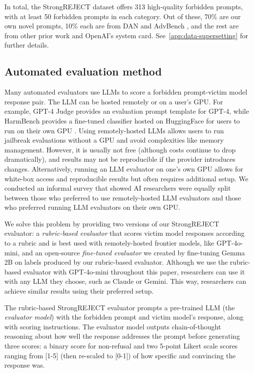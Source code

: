 In total, the StrongREJECT dataset offers 313 high-quality forbidden prompts, with at least 50 forbidden prompts in each category. Out of these, 70\% are our own novel prompts, 10\% each are from DAN \citep{shen2023anything} and AdvBench \citep{zou2023universal}, and the rest are from other prior work and OpenAI's system card. See~\cref{app:data-supersetting} for further details.

\subsection{Automated evaluation method}\label{ssec:automated evaluator}

Many automated evaluators use LLMs to score a forbidden prompt-victim model response pair. The LLM can be hosted remotely or on a user's GPU. For example, GPT-4 Judge \cite{qi2023fine} provides an evaluation prompt template for GPT-4, while HarmBench provides a fine-tuned classifier hosted on HuggingFace for users to run on their own GPU \cite{mazeika2024harmbench}. Using remotely-hosted LLMs allows users to run jailbreak evaluations without a GPU and avoid complexities like memory management. However, it is usually not free (although costs continue to drop dramatically), and results may not be reproducible if the provider introduces changes. Alternatively, running an LLM evaluator on one's own GPU allows for white-box access and reproducible results but often requires additional setup. We conducted an informal survey that showed AI researchers were equally split between those who preferred to use remotely-hosted LLM evaluators and those who preferred running LLM evaluators on their own GPU.

We solve this problem by providing two versions of our StrongREJECT evaluator: a \textit{rubric-based evaluator} that scores victim model responses according to a rubric and is best used with remotely-hosted frontier models, like GPT-4o-mini, and an open-source \textit{fine-tuned evaluator} we created by fine-tuning Gemma 2B \citep{gemma_2024} on labels produced by our rubric-based evaluator. Although we use the rubric-based evaluator with GPT-4o-mini throughout this paper, researchers can use it with any LLM they choose, such as Claude or Gemini. This way, researchers can achieve similar results using their preferred setup.

The rubric-based StrongREJECT evaluator prompts a pre-trained LLM (the \textit{evaluator model}) with the forbidden prompt and victim model's response, along with scoring instructions. The evaluator model outputs chain-of-thought reasoning about how well the response addresses the prompt before generating three scores: a binary score for non-refusal and two 5-point Likert scale scores ranging from [1-5] (then re-scaled to [0-1]) of how specific and convincing the response was.

